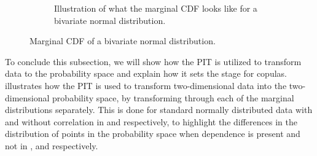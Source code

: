 \begin{figure}
\begin{subfigure}[t]{0.45\linewidth}
        \caption{Illustration of what the marginal \gls{CDF} looks like for a bivariate normal distribution.}
    \end{subfigure}
    \caption{Marginal \gls{CDF} of a bivariate normal distribution.}
    \label{fig:MarginalCDF}
\end{figure}

To conclude this subsection, we will show how the \gls{PIT} is utilized to transform data to the probability space and explain how it sets the stage for copulas.  illustrates how the \gls{PIT} is used to transform two-dimensional data into the two-dimensional probability space, by transforming through each of the marginal distributions separately. This is done for standard normally distributed data with and without correlation in  and  respectively, to highlight the differences in the distribution of points in the probability space when dependence is present and not in , and  respectively.

